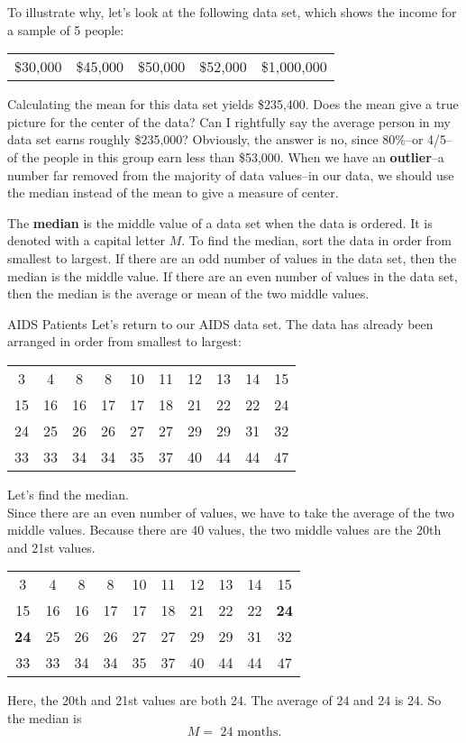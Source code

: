 To illustrate why, let's look at the following data set, which shows the income for a sample of 5 people: 
\begin{center}
\begin{tabular}{c c c c c}
\$30,000 & \$45,000 & \$50,000 & \$52,000 & \$1,000,000
\end{tabular}
\end{center}

Calculating the mean for this data set yields \$235,400. Does the mean give a true picture for the center of the data? Can I rightfully say the average person in my data set earns roughly \$235,000? Obviously, the answer is no, since 80\%--or 4/5--of the people in this group earn less than \$53,000. When we have an \textbf{outlier}--a number far removed from the majority of data values--in our data, we should use the median instead of the mean to give a measure of center.

The \textbf{median} is the middle value of a data set when the data is ordered. It is denoted with a capital letter $M$. To find the median, sort the data in order from smallest to largest. If there are an odd number of values in the data set, then the median is the middle value. If there are an even number of values in the data set, then the median is the average or mean of the two middle values.

\begin{example}[https://www.youtube.com/watch?v=KNEKKx8GYHg]{AIDS Patients}
Let's return to our AIDS data set. The data has already been arranged in order from smallest to largest:\begin{center}
\begin{tabular}{c c c c c c c c c c}
3 & 4 & 8 & 8 & 10 & 11 & 12 & 13 & 14 & 15\\
15 & 16 & 16 & 17 & 17 & 18 & 21 & 22 & 22 & 24\\
24 & 25 & 26 & 26 & 27 & 27 & 29 & 29 & 31 & 32\\
33 & 33 & 34 & 34 & 35 & 37 & 40 & 44 & 44 & 47\\
\end{tabular}
\end{center}
Let's find the median.\\

Since there are an even number of values, we have to take the average of the two middle values. Because there are 40 values, the two middle values are the 20th and 21st values.\begin{center}
\begin{tabular}{c c c c c c c c c c}
3 & 4 & 8 & 8 & 10 & 11 & 12 & 13 & 14 & 15\\
15 & 16 & 16 & 17 & 17 & 18 & 21 & 22 & 22 & {\Large\bfseries 24}\\
{\Large\bfseries 24} & 25 & 26 & 26 & 27 & 27 & 29 & 29 & 31 & 32\\
33 & 33 & 34 & 34 & 35 & 37 & 40 & 44 & 44 & 47\\
\end{tabular}
\end{center}
Here, the 20th and 21st values are both 24. The average of 24 and 24 is 24. So the median is \[M = \textrm{ 24 months.}\]
\end{example}

